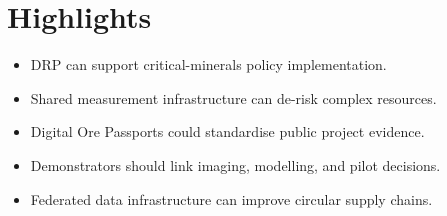 \documentclass[12pt,a4paper]{article}
\begin{document}
\section*{Highlights}

\begin{itemize}
\item DRP can support critical-minerals policy implementation.
\item Shared measurement infrastructure can de-risk complex resources.
\item Digital Ore Passports could standardise public project evidence.
\item Demonstrators should link imaging, modelling, and pilot decisions.
\item Federated data infrastructure can improve circular supply chains.
\end{itemize}
\end{document}
